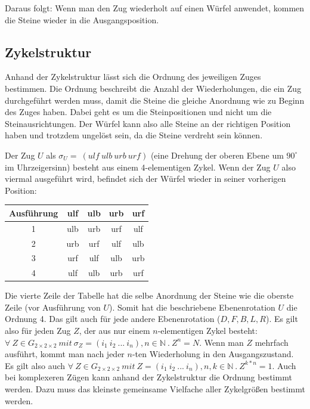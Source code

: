 \documentclass[12pt,a4paper, usenames, dvipsnames]{article}
\theoremstyle{mystyle}
\theoremstyle{definition}
\newcommand{\Gtwo}{\ensuremath{G_{2\times 2\times 2}}}
\begin{document}
Daraus folgt: Wenn man den Zug wiederholt auf einen Würfel anwendet, kommen die Steine wieder in die Ausgangsposition.
 
%
%
%
%
%
%
%
%
%
%
%
%
%
%
%
%
%
%
%
%


\subsection*{Zykelstruktur}


Anhand der Zykelstruktur lässt sich die Ordnung des jeweiligen Zuges bestimmen. Die Ordnung beschreibt die Anzahl der Wiederholungen, die ein Zug durchgeführt werden muss, damit die Steine die gleiche Anordnung wie zu Beginn des Zuges haben. Dabei geht es um die Steinpositionen und nicht um die Steinausrichtungen.
Der Würfel kann also alle Steine an der richtigen Position haben und trotzdem ungelöst sein, da die Steine verdreht sein können. 

Der Zug $U$ als $\sigma_U =\ (ulf \ ulb \ urb \ urf) $ (eine Drehung der oberen Ebene um $90^\circ$ im Uhrzeigersinn) besteht aus einem 4-elementigen Zykel.
Wenn der Zug $U$ also viermal ausgeführt wird, befindet sich der Würfel wieder in seiner vorherigen Position: 
\begin{center}
\begin{tabular}{ccccc}
\toprule
\textbf{Ausführung} & \textbf{ulf} & \textbf{ulb} & \textbf{urb} & \textbf{urf} \\
\midrule
1 & ulb & urb & urf & ulf \\

2 & urb & urf & ulf & ulb \\

3 & urf & ulf & ulb & urb \\

4 & ulf & ulb & urb & urf \\
\bottomrule
\end{tabular}
\end{center}

Die vierte Zeile der Tabelle hat die selbe Anordnung der Steine wie die oberste Zeile (vor Ausführung von $U$). 
Somit hat die beschriebene Ebenenrotation $U$ die Ordnung 4. Das gilt auch für jede andere Ebenenrotation ($D, F, B, L, R$).
Es gilt also für jeden Zug $Z$, der aus nur einem $n$-elementigen Zykel besteht: \\ 
${\forall \ Z \in \Gtwo\ mit \ \sigma_Z=(i_1 \ i_2 \ ... \ i_n), n \in \mathbb{N} \ . \  Z^n=N }$. 
Wenn man $Z$ mehrfach ausführt, kommt man nach jeder $n$-ten Wiederholung in den Ausgangszustand. \cite{TD} 
Es gilt also auch 
${\forall \ Z \in \Gtwo\ mit \ Z=(i_1 \ i_2 \ ... \ i_n), n,k \in \mathbb{N} \ . \  Z^{k*n}=1 }$.
Auch bei komplexeren Zügen kann anhand der Zykelstruktur die Ordnung bestimmt werden. Dazu muss das kleinste gemeinsame Vielfache aller Zykelgrößen bestimmt werden. \cite{TD}
\end{document}

